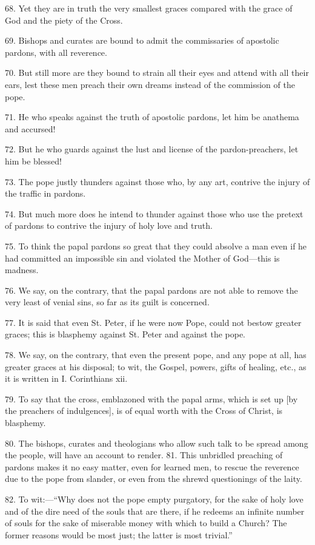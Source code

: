 68. Yet they are in truth the very smallest graces compared with the
grace of God and the piety of the Cross.

69. Bishops and curates are bound to admit the commissaries of
apostolic pardons, with all reverence.

70. But still more are they bound to strain all their eyes and attend
with all their ears, lest these men preach their own dreams instead of
the commission of the pope.

71. He who speaks against the truth of apostolic pardons, let him be
anathema and accursed!

72. But he who guards against the lust and license of the
pardon-preachers, let him be blessed!

73. The pope justly thunders against those who, by any art, contrive
the injury of the traffic in pardons.

74. But much more does he intend to thunder against those who use the
pretext of pardons to contrive the injury of holy love and truth.

75. To think the papal pardons so great that they could absolve a man
even if he had committed an impossible sin and violated the Mother of
God—this is madness.

76. We say, on the contrary, that the papal pardons are not able to
remove the very least of venial sins, so far as its guilt is concerned.

77. It is said that even St. Peter, if he were now Pope, could not
bestow greater graces; this is blasphemy against St. Peter and against
the pope.

78. We say, on the contrary, that even the present pope, and any pope
at all, has greater graces at his disposal; to wit, the Gospel, powers,
gifts of healing, etc., as it is written in I. Corinthians xii.

79. To say that the cross, emblazoned with the papal arms, which is set
up [by the preachers of indulgences], is of equal worth with the Cross
of Christ, is blasphemy.

80. The bishops, curates and theologians who allow such talk to be
spread among the people, will have an account to render. 81. This
unbridled preaching of pardons makes it no easy matter, even for
learned men, to rescue the reverence due to the pope from slander, or
even from the shrewd questionings of the laity.

82. To wit:—``Why does not the pope empty purgatory, for the sake of
holy love and of the dire need of the souls that are there, if he
redeems an infinite number of souls for the sake of miserable money
with which to build a Church? The former reasons would be most just;
the latter is most trivial.''

